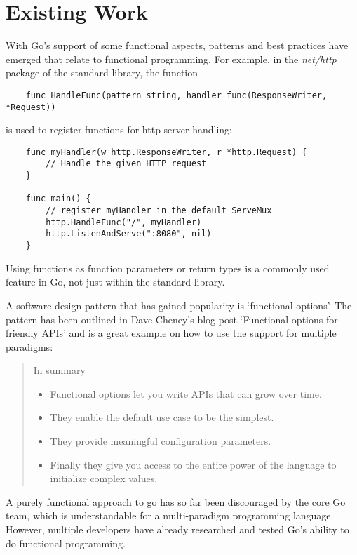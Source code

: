 \section{Existing Work}

With Go's support of some functional aspects, patterns and best practices have emerged that relate
to functional programming.
For example, in the \textit{net/http} package of the standard library, the function
\begin{verbatim}
    func HandleFunc(pattern string, handler func(ResponseWriter, *Request))
\end{verbatim}
is used to register functions for http server handling:

\begin{verbatim}
    func myHandler(w http.ResponseWriter, r *http.Request) {
        // Handle the given HTTP request
    }

    func main() {
        // register myHandler in the default ServeMux
        http.HandleFunc("/", myHandler)
        http.ListenAndServe(":8080", nil)
    }
\end{verbatim}
\autocite{go-http-doc}

Using functions as function parameters or return types is a commonly used feature in Go, not just
within the standard library.

A software design pattern that has gained popularity is `functional options'. The pattern has been
outlined in Dave Cheney's blog post `Functional options for friendly APIs'
and is a great example on how to use the support for multiple paradigms:

\begin{quote}
    In summary
    \begin{itemize}
        \item Functional options let you write APIs that can grow over time.
        \item They enable the default use case to be the simplest.
        \item They provide meaningful configuration parameters.
        \item Finally they give you access to the entire power of the language to initialize complex values.
    \end{itemize}
\end{quote}\autocite{functional-options}

A purely functional approach to go has so far been discouraged by the core Go team, which is understandable for
a multi-paradigm programming language.
However, multiple developers have already researched and tested Go's ability to do functional programming.

